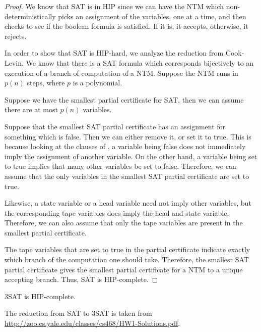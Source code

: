 \documentclass[runningheads,a4paper]{llncs}
\begin{document}
\begin{proof}
We know that SAT is in HIP since we can have the NTM which non-deterministically picks an assignment of the variables, one at a time, and then checks to see if the boolean formula is satisfied. If it is, it accepts, otherwise, it rejects. 

In order to show that SAT is HIP-hard, we analyze the reduction from Cook-Levin. We know that there is a SAT formula which corresponds bijectively to an execution of a branch of computation of a NTM. Suppose the NTM runs in $p(n)$ steps, where $p$ is a polynomial.

Suppose we have the smallest partial certificate for SAT, then we can assume there are at most $p(n)$ variables. 

Suppose that the smallest SAT partial certificate has an assignment for something which is false. Then we can either remove it, or set it to true. This is because looking at the clauses of \cite{Garey}, a variable being false does not immediately imply the assignment of another variable. On the other hand, a variable being set to true implies that many other variables be set to false. Therefore, we can assume that the only variables in the smallest SAT partial certificate are set to true.

Likewise, a state variable or a head variable need not imply other variables, but the corresponding tape variables does imply the head and state variable. Therefore, we can also assume that only the tape variables are present in the smallest partial certificate.

The tape variables that are set to true in the partial certificate indicate exactly which branch of the computation one should take. Therefore, the smallest SAT partial certificate gives the smallest partial certificate for a NTM to a unique accepting branch. Thus, SAT is HIP-complete.
\end{proof}

\begin{theorem}
3SAT is HIP-complete.
\end{theorem}

The reduction from SAT to 3SAT is taken from \url{http://zoo.cs.yale.edu/classes/cs468/HW1-Solutions.pdf}.
\end{document}
